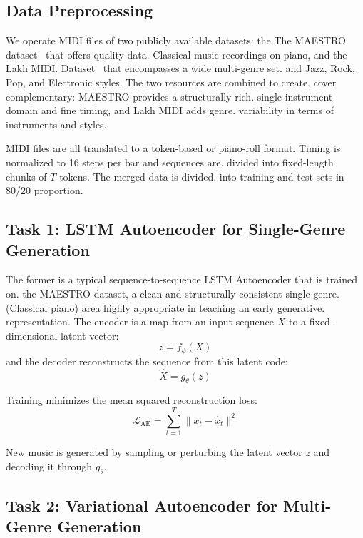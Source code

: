 \documentclass[conference]{IEEEtran}
\begin{document}
\subsection{Data Preprocessing}

We operate MIDI files of two publicly available datasets: the
The MAESTRO dataset~\cite{hawthorne2018enabling} that offers quality data.
Classical music recordings on piano, and the Lakh MIDI.
Dataset~\cite{raffel2016learning} that encompasses a wide multi-genre set.
and Jazz, Rock, Pop, and Electronic styles. The two resources are combined to create.
cover complementary: MAESTRO provides a structurally rich.
single-instrument domain and fine timing, and Lakh MIDI adds genre.
variability in terms of instruments and styles.

MIDI files are all translated to a token-based or piano-roll format.
Timing is normalized to 16 steps per bar and sequences are.
divided into fixed-length chunks of $T$ tokens. The merged data is divided.
into training and test sets in 80/20 proportion.

\subsection{Task 1: LSTM Autoencoder for Single-Genre Generation}

The former is a typical sequence-to-sequence LSTM Autoencoder that is trained on.
the MAESTRO dataset, a clean and structurally consistent single-genre.
(Classical piano) area highly appropriate in teaching an early generative.
representation. The encoder is a map from an input sequence $X$ to a fixed-dimensional latent vector:
\begin{equation}
z = f_\phi(X)
\end{equation}
and the decoder reconstructs the sequence from this latent code:
\begin{equation}
\hat{X} = g_\theta(z)
\end{equation}

Training minimizes the mean squared reconstruction loss:
\begin{equation}
\mathcal{L}_{\text{AE}} = \sum_{t=1}^{T} \|x_t - \hat{x}_t\|^2
\end{equation}

New music is generated by sampling or perturbing the latent vector $z$ and
decoding it through $g_\theta$.

\subsection{Task 2: Variational Autoencoder for Multi-Genre Generation}
\end{document}

